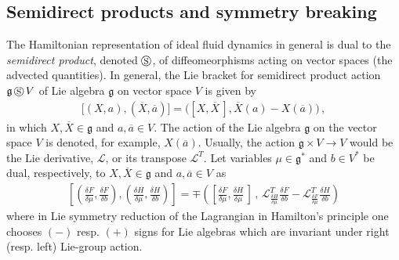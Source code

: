 \documentclass[11pt, oneside]{article}   	%
\numberwithin{equation}{section}
\theoremstyle{plain}
\theoremstyle{definition}
\theoremstyle{remark}
\newcommand{\<}{\langle}
\renewcommand{\>}{\rangle}
\begin{document}
\subsection{Semidirect products and symmetry breaking} 
The Hamiltonian representation of ideal fluid dynamics in general is dual to the \emph{semidirect product\/}, denoted $\circledS$,
of diffeomeorphisms acting on vector spaces (the advected quantities). 
In general, the Lie bracket for
semidirect product action $\mathfrak{g}\,\circledS\,V$ of Lie algebra $\mathfrak{g}$
on vector space $V$ is given by 
\begin{align}
\big[(X,a), (\overline{X},\overline{a})\big]
=
\big([X,\overline{X}\,],\overline{X}(a)-X(\overline{a})\big)
\,,\label{SDPaction}
\end{align}
in which $X,\overline{X}\in\mathfrak{g}$ and $a,\overline{a}\in V$.
The action of the Lie algebra $\mathfrak{g}$ on the vector space $V$ is denoted, for
example, $X(\overline{a})$. Usually, the action $\mathfrak{g}\times V\to V$ would be the Lie derivative,
$ \mathcal{L}$, or its transpose  $ \mathcal{L}^T$. Let variables $\mu\in\mathfrak{g}^*$ and $b\in V^*$ be dual, 
respectively, to $X,\overline{X}\in\mathfrak{g}$ and $a,\overline{a}\in V$ as
\begin{align}
\left[\left(\frac{\delta F}{\delta \mu} , \frac{\delta F}{\delta b}\right), \left(\frac{\delta H}{\delta \mu},\frac{\delta H}{\delta b}\right)\right]
= \mp
\left( \left[\frac{\delta F}{\delta \mu},\frac{\delta H}{\delta \mu}\,\right] \,,\,
 \mathcal{L}^T_{\frac{\delta H}{\delta \mu}} \frac{\delta F}{\delta b} -  \mathcal{L}^T_{\frac{\delta F}{\delta \mu}} \frac{\delta H}{\delta b}\right)
\label{Dual-vars}
\end{align}
where in Lie symmetry reduction of the Lagrangian in Hamilton's principle one chooses $(-)$ resp. $(+)$ 
signs for Lie algebras which are invariant under right (resp. left) Lie-group action. 
 
\end{document}
